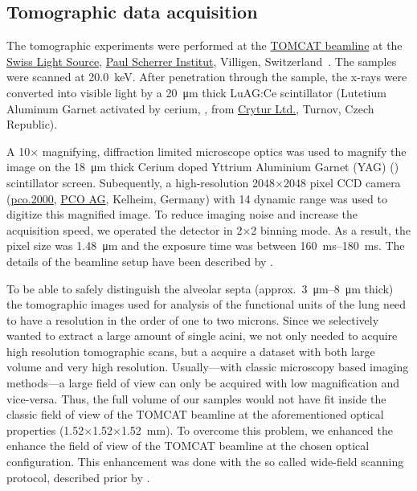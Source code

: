 \documentclass[%
	draft=true,
	paper=a4,%
	twoside=true,%
	abstract=true]{scrartcl}
\newcommand{\todojcs}[2][]{\todo[color=magenta!62!white, #1]{Johannes: #2}}
\begin{document}
\subsection{Tomographic data acquisition}\label{sec:tomcat}
The tomographic experiments were performed at the \href{http://www.psi.ch/sls/tomcat/}{TOMCAT beamline} at the \href{http://www.psi.ch/sls/}{Swiss Light Source}, \href{http://www.psi.ch/}{Paul Scherrer Institut}, Villigen, Switzerland~\cite{Stampanoni2006a}. The samples were scanned at \SI{20.0}{\kilo\electronvolt}. After penetration through the sample, the x-rays were converted into visible light by a \SI{20}{\micro\meter} thick LuAG:Ce scintillator (Lutetium Aluminum Garnet activated by cerium, , from \href{http://www.crytur.cz/}{Crytur Ltd.}, Turnov, Czech Republic).

A 10\(\times\) magnifying, diffraction limited microscope optics was used to magnify the image on the \SI{18}{\micro\meter} thick Cerium doped Yttrium Aluminium Garnet (YAG) () scintillator screen. Subequently, a high-resolution 2048\(\times\)2048 pixel CCD camera (\href{http://www.pco.de/sensitive-cameras/pco2000/}{pco.2000}, \href{http://www.pco.de/}{PCO AG}, Kelheim, Germany) with \SI{14}{\bit} dynamic range was used to digitize this magnified image. To reduce imaging noise and increase the acquisition speed, we operated the detector in 2\(\times\)2 binning mode. As a result, the pixel size was \SI{1.48}{\micro\meter} and the exposure time was between \SIrange{160}{180}{\milli\second}. The details of the beamline setup have been described by \citet{Stampanoni2006a}.

To be able to safely distinguish the alveolar septa (approx.~\SIrange{3}{8}{\micro\meter} thick\todojcs{Correct?}) the tomographic images used for analysis of the functional units of the lung need to have a resolution in the order of one to two microns. Since we selectively wanted to extract a large amount of single acini, we not only needed to acquire high resolution tomographic scans, but a acquire a dataset with both large volume and very high resolution. Usually---with classic microscopy based imaging methods---a large field of view can only be acquired with low magnification and vice-versa. Thus, the full volume of our samples would not have fit inside the classic field of view of the TOMCAT beamline at the aforementioned optical properties (1.52\(\times\)1.52\(\times\)\SI{1.52}{\milli\meter}). To overcome this problem, we enhanced the enhance the field of view of the TOMCAT beamline at the chosen optical configuration. This enhancement was done with the so called wide-field scanning protocol, described prior by \citet{Haberthuer2010}.
\end{document}
